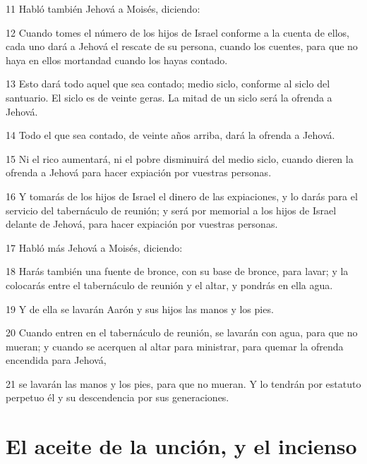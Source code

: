 \par 11 Habló también Jehová a Moisés, diciendo:
\par 12 Cuando tomes el número de los hijos de Israel conforme a la cuenta de ellos, cada uno dará a Jehová el rescate de su persona, cuando los cuentes, para que no haya en ellos mortandad cuando los hayas contado.
\par 13 Esto dará todo aquel que sea contado; medio siclo,  conforme al siclo del santuario. El siclo es de veinte geras. La mitad de un siclo será la ofrenda a Jehová.
\par 14 Todo el que sea contado, de veinte años arriba, dará la ofrenda a Jehová.
\par 15 Ni el rico aumentará, ni el pobre disminuirá del medio siclo,  cuando dieren la ofrenda a Jehová para hacer expiación por vuestras personas.
\par 16 Y tomarás de los hijos de Israel el dinero de las expiaciones, y lo darás para el servicio del tabernáculo de reunión; y será por memorial a los hijos de Israel delante de Jehová, para hacer expiación por vuestras personas.
\par 17 Habló más Jehová a Moisés, diciendo:
\par 18 Harás también una fuente de bronce, con su base de bronce, para lavar; y la colocarás entre el tabernáculo de reunión y el altar, y pondrás en ella agua.
\par 19 Y de ella se lavarán Aarón y sus hijos las manos y los pies.
\par 20 Cuando entren en el tabernáculo de reunión, se lavarán con agua, para que no mueran; y cuando se acerquen al altar para ministrar, para quemar la ofrenda encendida para Jehová,
\par 21 se lavarán las manos y los pies, para que no mueran. Y lo tendrán por estatuto perpetuo él y su descendencia por sus generaciones.

\section*{El aceite de la unción, y el incienso}

